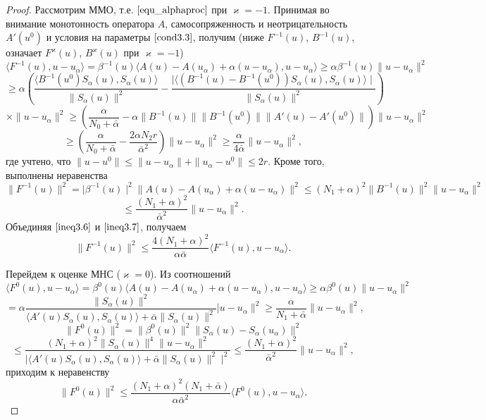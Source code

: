\begin{proof} Рассмотрим  ММО, т.е. $\eqref{equ_alphaproc}$ при $\varkappa=-1$. Принимая во внимание монотонность оператора $A$, самосопряженность и неотрицательность $A'(u^0)$ и условия на параметры $\eqref{cond3.3}$, получим (ниже $F^{-1}(u)$, $B^{-1}(u)$, означает $F^\varkappa(u)$, $B^\varkappa(u)$ при $\varkappa=-1$)
$$ \langle F^{-1}(u), u-u_\alpha\rangle=\beta^{-1}(u)\langle A(u)-A(u_\alpha)+ \alpha(u-u_\alpha),u-u_\alpha\rangle\ge\alpha\beta^{-1}(u)\|u-u_\alpha\|^2
$$ $$\ge\alpha\left(\frac{\langle B^{-1}(u^0)S_\alpha(u), S_\alpha(u)\rangle}{\|S_\alpha (u)\|^2}-\frac{\mid\langle (B^{-1}(u)-B^{-1}(u^0))S_\alpha(u), S_\alpha (u)\rangle \mid}{\|S_\alpha (u)\|^2}\right)$$
$$\times \|u-u_\alpha\|^2 \ge\left(\frac{\alpha}{N_0+\bar\alpha}-\alpha\|B^{-1}(u)\|\|B^{-1}(u^0)\|\|A'(u)-A'(u^0)\|\right)\|u-u_\alpha\|^2$$ 
\begin{equation}\label{ineq3.6}
\ge\left(\frac{\alpha}{N_0+\bar\alpha}-\frac{2\alpha N_2r}{\bar\alpha ^2}\right)\|u-u_\alpha\|^2\ge\frac{\alpha}{4\bar\alpha}\|u-u_\alpha\|^2,\end{equation}
где учтено, что $\|u-u^0\|\le\|u-u_\alpha\|+\|u_\alpha-u^0\|\le 2r.$ Кроме того, выполнены неравенства $$\|F^{-1}(u)\|^2=\mid\beta^{-1}(u)\mid^2\|A(u)-A(u_\alpha)+\alpha(u-u_\alpha)\|^2\le(N_1+\alpha)^2\|B^{-1}(u)\|^2\|u-u_\alpha\|^2 $$
\begin{equation}\label{ineq3.7}
\le\frac{(N_1+\alpha)^2}{\bar\alpha^2}\|u-u_\alpha\|^2 .
\end{equation}
Объединяя $\eqref{ineq3.6}$ и $\eqref{ineq3.7}$, получаем
\begin{equation}\label{ineq3.8}
\|F^{-1}(u)\|^2\le\frac{4(N_1+\alpha)^2}{\alpha\bar\alpha}\langle F^{-1}(u), u-u_\alpha\rangle.
\end{equation}

Перейдем к оценке МНС ($\varkappa=0$). Из соотношений
$$\langle F^0(u), u-u_\alpha\rangle=\beta^0(u)\langle A(u)-A(u_\alpha)+\alpha(u-u_\alpha), u-u_\alpha\rangle\ge\alpha\beta^0(u)\|u-u_\alpha\|^2$$ 
\begin{equation}\label{ineq3.9}
=\alpha\frac{\|S_\alpha (u)\|^2}{\langle A'(u)S_\alpha (u),S_\alpha (u)\rangle +\bar\alpha\|S_\alpha (u)\|^2}|u-u_\alpha\|^2\ge \frac{\alpha}{N_1+\bar\alpha}\|u-u_\alpha\|^2,\end{equation}
$$
\|F^0(u)\|^2=\|\beta^0(u)\|^2\|S_\alpha(u)-S_\alpha(u_\alpha)\|^2 $$
\begin{equation}\label{ineq3.10}\le\frac{(N_1+\alpha)^2\|S_\alpha (u)\|^4\|u-u_\alpha\|^2}{\mid\langle A'(u)S_\alpha (u),S_\alpha (u)\rangle +\bar\alpha\|S_\alpha (u)\|^2\mid ^2}\le\frac{(N_1+\alpha)^2}{\bar\alpha^2}\|u-u_\alpha\|^2,
\end{equation}
приходим к неравенству
$$\|F^0(u)\|^2\le\frac{(N_1+\alpha)^2(N_1+\bar\alpha)}{\alpha\bar\alpha^2}\langle F^0(u), u-u_\alpha\rangle.$$


\end{proof}

